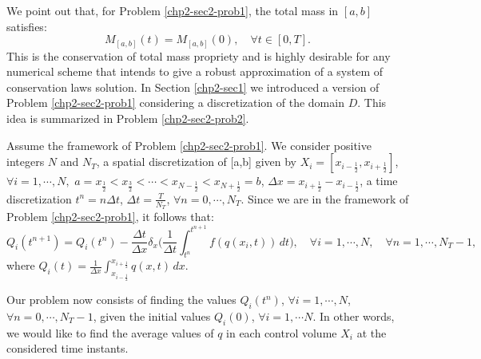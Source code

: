 We point out that, for Problem \ref{chp2-sec2-prob1}, 
the total mass in $[a,b]$ satisfies: 
\begin{equation}
	{M}_{[a,b]}(t) = {M}_{[a,b]}(0), \quad \forall t \in [0,T].
\end{equation}
This is the conservation of total mass propriety and is highly desirable
for any numerical scheme that intends to give a robust approximation of a
system of conservation laws solution.
In Section \ref{chp2-sec1} we introduced a version of Problem \ref{chp2-sec2-prob1}
considering a discretization of the domain $D$. 
This idea is summarized in Problem \ref{chp2-sec2-prob2}.
\begin{prob}
    \label{chp2-sec2-prob2}
		Assume the framework of Problem \ref{chp2-sec2-prob1}.
    We consider positive integers $N$ and $N_T$, a spatial discretization of [a,b] given by
    $X_i = [x_{i-\frac{1}{2}}, x_{i+\frac{1}{2}}]$,$\forall i = 1, \cdots, N,$ 
		$a = x_{\frac{1}{2}} < x_{\frac{3}{2}} < \cdots < x_{N-\frac{1}{2}} < x_{N+\frac{1}{2}} = b$,
		$\Delta x = x_{i+\frac{1}{2}}-x_{i-\frac{1}{2}}$,
		a time discretization
    $t^{n} = n\Delta t$, $\Delta t = \frac{T}{N_T}$, $\forall n = 0, \cdots, N_T$.
		Since we are in the framework of Problem \ref{chp2-sec2-prob1}, it follows that:
		\begin{equation}
			\label{1d-fvexact-scheme}
						{Q}_i(t^{n+1}) =  {Q}_i(t^{n}) -
						\frac{\Delta t}{\Delta x} \delta _x\bigg( \frac{1}{\Delta t}\int_{t^{n}}^{t^{n+1}}
						{f}({q}(x_{i}, t)) \,dt \bigg),
						\quad \forall i = 1, \cdots, N,
						\quad \forall n = 1, \cdots, N_T-1,
		\end{equation}
		where ${Q}_i(t) = \frac{1}{\Delta x}
		\int_{x_{i-\frac{1}{2}}}^{x_{i+\frac{1}{2}}} {q}(x,t) \,dx$.

		Our problem now consists of finding the values ${Q}_i(t^{n})$, 
		$\forall i = 1, \cdots, N$, $\forall n = 0, \cdots, N_T-1$,
		given the initial values ${Q}_i(0)$, $\forall i = 1, \cdots N$.
		In other words, we would like to find the average values of ${q}$
		in each control volume $X_i$ at the considered time instants.
\end{prob}

